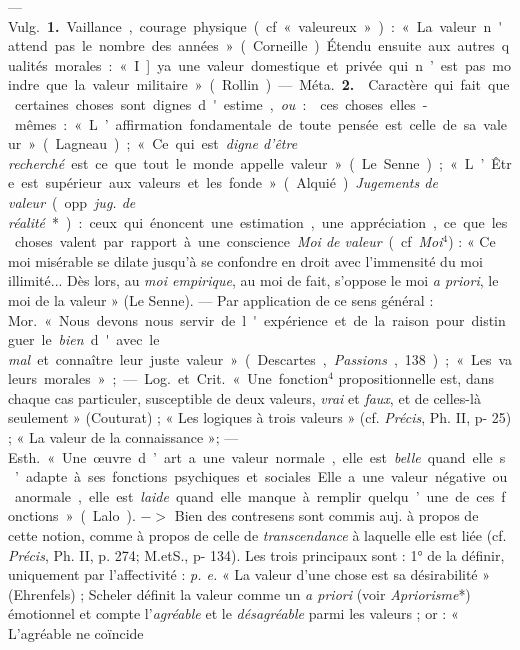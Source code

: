 
	\begin{itemize}[leftmargin=1cm, label=, itemsep=1pt]

 — \si{Vulg.} {\bf 1.} Vaillance, courage physique (cf. «
valeureux ») : « La valeur n'attend pas le nombre des années » (Corneille).
Étendu ensuite aux autres qualités morales : « I] ya une valeur domestique et
privée qui n’est pas moindre que la valeur militaire » (Rollin).

— \si{Méta.}  {\bf 2.}  Caractère qui fait que certaines
choses sont dignes d'estime, {\it ou} :  ces choses
elles-mêmes : « L’affirmation fondamentale de toute pensée est celle de sa
valeur » (Lagneau) ; « Ce qui est {\it digne d’être recherché} est ce que
tout le monde appelle valeur » (Le Senne) ; « L’Être est supérieur aux
valeurs et les fonde » (Alquié). {\it Jugements de valeur} (opp. {\it jug. de
réalité}*) : ceux qui énoncent une estimation, une appréciation, ce que les
choses valent par rapport à une conscience. {\it Moi de valeur} (cf.
{\it Moi}$^4$) : « Ce moi misérable se dilate jusqu’à se confondre en droit
avec l’immensité du moi illimité... Dès lors, au {\it moi empirique}, au moi
de fait, s’oppose le moi {\it a priori}, le moi de la valeur » (Le Senne). —
Par application de ce sens général : \si{Mor.} « Nous devons nous servir de
l'expérience et de la raison pour distinguer le {\it bien} d'avec le {\it
mal} et connaître leur juste valeur » (Descartes, {\it Passions}, 138) ; «
Les valeurs morales » ; — \si{Log.} et \si{Crit.} « Une fonction$^4$
propositionnelle est, dans chaque cas particuler, susceptible de deux
valeurs, {\it vrai} et {\it faux}, et de celles-là seulement » (Couturat) ; «
Les logiques à trois valeurs » (cf. {\it Précis}, Ph. II, p- 25) ; « La
valeur de la connaissance »; — \si{Esth.} « Une œuvre d’art a une valeur
normale, elle est {\it belle} quand elle s’adapte à ses fonctions
psychiques et sociales... Elle a une valeur négative ou anormale, elle est
{\it laide} quand elle manque à remplir quelqu’une de ces fonctions » (Lalo).
$->$ Bien des contresens sont commis auj. à propos de cette notion, comme à
propos de celle de {\it transcendance} à laquelle elle est liée (cf.
{\it Précis}, Ph. II, p. 274; M.etS., p- 134). Les trois principaux sont : 1°
de la définir, uniquement par l'affectivité : {\it p. e.} « La valeur d’une
chose est sa désirabilité » (Ehrenfels) ; Scheler définit la valeur comme un
{\it a priori} (voir {\it Apriorisme}*) émotionnel et compte l’{\it agréable}
et le {\it désagréable} parmi les valeurs ; or : « L’agréable ne coïncide

\end{itemize}
